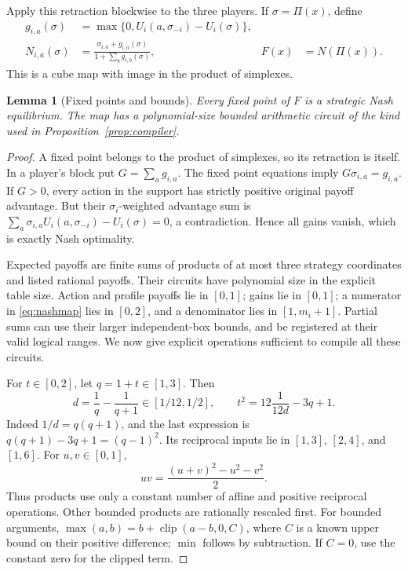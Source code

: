 \documentclass[11pt,a4paper]{article}
\numberwithin{equation}{section}
\newtheorem{lemma}[theorem]{Lemma}
\theoremstyle{definition}
\DeclareMathOperator{\clip}{clip}
\begin{document}
Apply this retraction blockwise to the three players. If
\(\sigma=\Pi(x)\), define
\begin{align}
 g_{i,a}(\sigma)
   &=\max\{0,U_i(a,\sigma_{-i})-U_i(\sigma)\},\label{eq:gain}\\
 N_{i,a}(\sigma)
   &=\frac{\sigma_{i,a}+g_{i,a}(\sigma)}
            {1+\sum_b g_{i,b}(\sigma)},
 &F(x)&=N(\Pi(x)).\label{eq:nashmap}
\end{align}
This is a cube map with image in the product of simplexes.

\begin{lemma}[Fixed points and bounds]\label{lem:nashmap}
Every fixed point of \(F\) is a strategic Nash equilibrium. The map
has a polynomial-size bounded arithmetic circuit of the kind used
in Proposition~\ref{prop:compiler}.
\end{lemma}
\begin{proof}
A fixed point belongs to the product of simplexes, so its retraction
is itself. In a player's block put \(G=\sum_a g_{i,a}\). The fixed
point equations imply \(G\sigma_{i,a}=g_{i,a}\). If \(G>0\), every
action in the support has strictly positive original payoff advantage.
But their \(\sigma_i\)-weighted advantage sum is
\(\sum_a\sigma_{i,a}U_i(a,\sigma_{-i})-U_i(\sigma)=0\), a
contradiction. Hence all gains vanish, which is exactly Nash optimality.

Expected payoffs are finite sums of products of at most three strategy
coordinates and listed rational payoffs. Their circuits have polynomial
size in the explicit table size. Action and profile payoffs lie in
\([0,1]\); gains lie in \([0,1]\); a numerator in
\eqref{eq:nashmap} lies in \([0,2]\), and a denominator lies in
\([1,m_i+1]\). Partial sums can use their larger independent-box
bounds, and be registered at their valid logical ranges. We now give
explicit operations sufficient to compile all these circuits.

For \(t\in[0,2]\), let \(q=1+t\in[1,3]\). Then
\begin{equation}\label{eq:square}
 d=\frac1q-\frac1{q+1}\in[1/12,1/2],
 \qquad t^2=12\frac1{12d}-3q+1.
\end{equation}
Indeed \(1/d=q(q+1)\), and the last expression is
\(q(q+1)-3q+1=(q-1)^2\).
Its reciprocal inputs lie in \([1,3]\), \([2,4]\), and \([1,6]\).
For \(u,v\in[0,1]\),
\[
 uv=\frac{(u+v)^2-u^2-v^2}{2}.
\]
Thus products use only a constant number of affine and positive
reciprocal operations. Other bounded products are rationally rescaled
first. For bounded arguments,
\(\max(a,b)=b+\clip(a-b,0,C)\), where \(C\) is a known upper bound
on their positive difference; \(\min\) follows by subtraction. If
\(C=0\), use the constant zero for the clipped term.


\end{proof}
\end{document}
